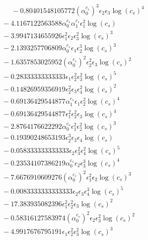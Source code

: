 \documentclass[10pt]{article}
\begin{document}
\begin{align*}
\phantom{F_{s,5}} &\phantom{={}}{}  - 0.80401548105772 \left(\alpha_{0}^{c_s}\right)^{3} \epsilon_{2} \epsilon_{3} \log{\left(c_{s} \right)}^{4} \\
&{}  - 4.1167122563588 \alpha_{0}^{c_s} \alpha_{1}^{c_s} \epsilon_{1}^{2} \log{\left(c_{s} \right)} \\
&{}  - 3.9947134655926 \epsilon_{1}^{2} \epsilon_{2} \epsilon_{3}^{2} \log{\left(c_{s} \right)}^{3} \\
&{}  - 2.1393257706809 \alpha_{0}^{c_s} \epsilon_{1} \epsilon_{2}^{3} \log{\left(c_{s} \right)}^{3} \\
&{}  - 1.6357853025952 \left(\alpha_{0}^{c_s}\right)^{2} \epsilon_{2}^{2} \epsilon_{3} \log{\left(c_{s} \right)}^{2} \\
&{}  - 0.28333333333333 \epsilon_{1} \epsilon_{2}^{2} \epsilon_{3}^{2} \log{\left(c_{s} \right)}^{5} \\
&{}  - 0.14826959356919 \epsilon_{2}^{2} \epsilon_{3} \epsilon_{4}^{2} \log{\left(c_{s} \right)}^{2} \\
&{}  - 0.69136429544877 \alpha_{1}^{c_s} \epsilon_{1} \epsilon_{2}^{2} \log{\left(c_{s} \right)}^{4} \\
&{}  - 0.69136429544877 \epsilon_{1}^{2} \epsilon_{2}^{2} \epsilon_{3} \log{\left(c_{s} \right)}^{4} \\
&{}  - 2.8764176622292 \alpha_{0}^{c_s} \epsilon_{1}^{2} \epsilon_{2}^{2} \log{\left(c_{s} \right)}^{3} \\
&{}  - 0.19390248653193 \epsilon_{2}^{3} \epsilon_{3} \epsilon_{4} \log{\left(c_{s} \right)} \\
&{}  - 0.058333333333333 \epsilon_{2} \epsilon_{3}^{2} \epsilon_{4}^{2} \log{\left(c_{s} \right)}^{5} \\
&{}  - 0.23534107386219 \alpha_{0}^{c_s} \epsilon_{2} \epsilon_{3}^{3} \log{\left(c_{s} \right)}^{4} \\
&{}  - 7.6676910609276 \left(\alpha_{0}^{c_s}\right)^{2} \epsilon_{1}^{2} \epsilon_{2} \log{\left(c_{s} \right)}^{3} \\
&{}  - 0.0083333333333333 \epsilon_{2} \epsilon_{3} \epsilon_{4}^{3} \log{\left(c_{s} \right)}^{5} \\
&{}  - 17.383935082396 \epsilon_{1}^{2} \epsilon_{2}^{2} \epsilon_{3} \log{\left(c_{s} \right)}^{2} \\
&{}  - 0.58316127583974 \left(\alpha_{0}^{c_s}\right)^{2} \epsilon_{2} \epsilon_{3}^{2} \log{\left(c_{s} \right)}^{2} \\
&{}  - 4.9917676795191 \epsilon_{1} \epsilon_{2}^{2} \epsilon_{3}^{2} \log{\left(c_{s} \right)}^{3} \\

\end{align*}
\end{document}
